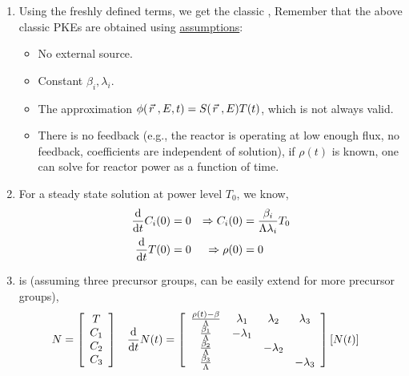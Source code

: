 \documentclass{school-22.211-notes}
\begin{document}
\begin{enumerate}
\item Using the freshly defined terms, we get the classic ,
Remember that the above classic PKEs are obtained using \uline{assumptions}: 
\begin{itemize}
\item No external source.
\item Constant $\beta_i, \lambda_i$. 
\item The approximation $\phi(\left.\vec{r}\right., E, t) = S(\left.\vec{r}\right., E) T(t)$, which is not always valid. 
\item There is no feedback (e.g., the reactor is operating at low enough flux, no feedback, coefficients are independent of solution), if $\rho(t)$ is known, one can solve for reactor power as a function of time.
\end{itemize}

\item For a steady state solution at power level $T_0$, we know, 
  \begin{align}
    \frac{\mathrm{d}}{\mathrm{d}t} C_i (0) &= 0  &\Rightarrow  C_i (0) &= \frac{\beta_i}{\Lambda \lambda_i} T_0  \notag \\
    \frac{\mathrm{d}}{\mathrm{d}t} T(0) &= 0  &\Rightarrow \rho(0) &= 0  \label{in-hour}
  \end{align}

\item {} is (assuming three precursor groups, can be easily extend for more precursor groups),  
\begin{align}
N &= \left[ \begin{array}{c} T \\ C_1 \\ C_2 \\ C_3 \end{array} \right]  
& \frac{\mathrm{d}}{\mathrm{d}t} N(t) &= \left[ \begin{array}{cccc} 
\frac{\rho(t) - \beta}{\Lambda} & \lambda_1 & \lambda_2 & \lambda_3 \\
\frac{\beta_1}{\Lambda} & - \lambda_1 & & \\
\frac{\beta_2}{\Lambda} & & -\lambda_2 & \\
\frac{\beta_3}{\Lambda} & & & -\lambda_3 \end{array} \right] 
\left[ N(t) \right] 
\end{align}
\end{enumerate}
\end{document}
